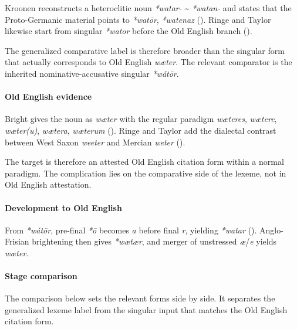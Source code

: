 \documentclass[
  british,
  a4paper,
]{article}
\begin{document}
Kroonen reconstructs a heteroclitic noun \emph{*watar-}
\textasciitilde{} \emph{*watan-} and states that the Proto-Germanic
material points to \emph{*watōr}, \emph{*watenaz}
(). Ringe and Taylor
likewise start from singular \emph{*wator} before the Old English branch
().

The generalized comparative label is therefore broader than the singular
form that actually corresponds to Old English \emph{wæter}. The relevant
comparator is the inherited nominative-accusative singular
\emph{*wátōr}.

\paragraph{Old English evidence}\label{old-english-evidence-33}

Bright gives the noun as \emph{wæter} with the regular paradigm
\emph{wæteres}, \emph{wætere}, \emph{wæter(u)}, \emph{wætera},
\emph{wæterum} (). Ringe and Taylor add the dialectal contrast between West Saxon
\emph{weeter} and Mercian \emph{weter}
().

The target is therefore an attested Old English citation form within a
normal paradigm. The complication lies on the comparative side of the
lexeme, not in Old English attestation.

\paragraph{Development to Old
English}\label{development-to-old-english-33}

From \emph{*wátōr}, pre-final \emph{*ō} becomes \emph{a} before final
\emph{r}, yielding \emph{*watar} (). Anglo-Frisian brightening then gives
\emph{*wætær}, and merger of unstressed \emph{æ}/\emph{e} yields
\emph{wæter}.

\paragraph{Stage comparison}\label{stage-comparison-2}

The comparison below sets the relevant forms side by side. It separates
the generalized lexeme label from the singular input that matches the
Old English citation form.
\end{document}
